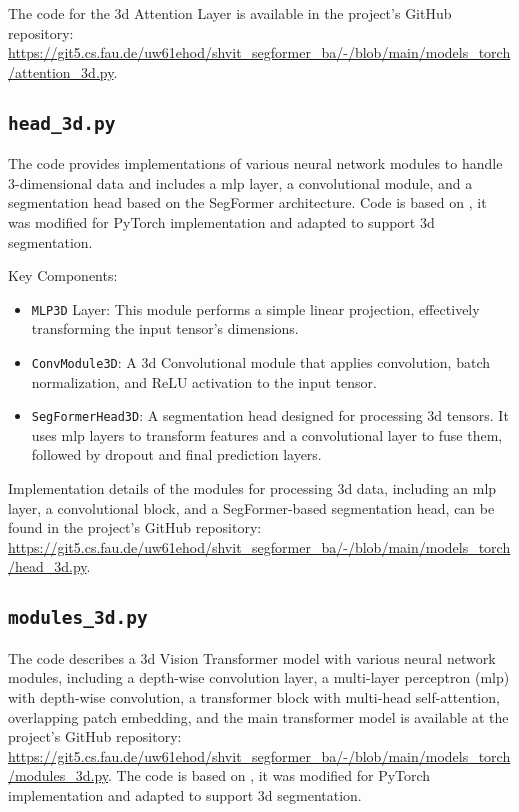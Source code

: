 The code for the \gls{3d} Attention Layer is available in the project's GitHub repository: \url{https://git5.cs.fau.de/uw61ehod/shvit_segformer_ba/-/blob/main/models_torch/attention_3d.py}.


\subsection{{\tt head\_3d.py}}
The code provides implementations of various neural network modules to handle 3-dimensional data and includes a \gls{mlp} layer, a convolutional module, and a segmentation head based on the SegFormer architecture. Code is based on \cite{IMvision12}, it was modified for PyTorch implementation and adapted to support \gls{3d} segmentation.

\medskip

\noindent Key Components:
\begin{itemize}
	\item {\tt MLP3D} Layer: This module performs a simple linear projection, effectively transforming the input tensor's dimensions.
	
	\item {\tt ConvModule3D}: A \gls{3d} Convolutional module that applies convolution, batch normalization, and ReLU activation to the input tensor.
	
	\item {\tt SegFormerHead3D}: A segmentation head designed for processing \gls{3d} tensors. It uses \gls{mlp} layers to transform features and a convolutional layer to fuse them, followed by dropout and final prediction layers.
\end{itemize}

Implementation details of the modules for processing \gls{3d} data, including an \gls{mlp} layer, a convolutional block, and a SegFormer-based segmentation head, can be found in the project's GitHub repository: \url{https://git5.cs.fau.de/uw61ehod/shvit_segformer_ba/-/blob/main/models_torch/head_3d.py}.



\subsection{{\tt modules\_3d.py}}
The code describes a \gls{3d} Vision Transformer model with various neural network modules, including a depth-wise convolution layer, a multi-layer perceptron (\gls{mlp}) with depth-wise convolution, a transformer block with multi-head self-attention, overlapping patch embedding, and the main transformer model is available at the project's GitHub repository: \url{https://git5.cs.fau.de/uw61ehod/shvit_segformer_ba/-/blob/main/models_torch/modules_3d.py}. The code is based on \cite{IMvision12}, it was modified for PyTorch implementation and adapted to support \gls{3d} segmentation.

